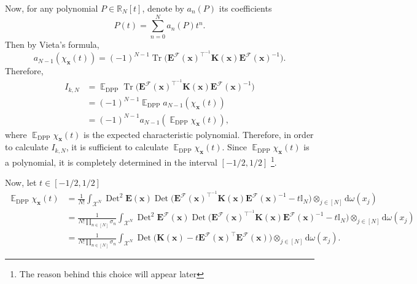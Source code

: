 \documentclass[twoside,11pt]{book}
\numberwithin{theorem}{chapter}
\numberwithin{definition}{chapter}
\numberwithin{proposition}{chapter}
\numberwithin{corollary}{chapter}
\numberwithin{example}{chapter}
\numberwithin{lemma}{chapter}
\numberwithin{assumption}{chapter}
\numberwithin{equation}{chapter}
\numberwithin{figure}{chapter}
\DeclareMathOperator{\Tr}{Tr}
\DeclareMathOperator{\Det}{Det}
\DeclareMathOperator{\DPP}{\mathrm{DPP}}
\DeclareMathOperator{\Tran}{\intercal}
\DeclareMathOperator{\EX}{\mathbb{E}}
\begin{document}
Now, for any polynomial $P \in \mathbb{R}_{N}[t]$, denote by $a_{n}(P)$ its coefficients
\begin{equation}
P(t) = \sum\limits_{n = 0}^{N} a_{n}(P)t^{n}.
\end{equation}
Then by Vieta's formula, 
\begin{equation}
a_{N-1}(\chi_{\bm{x}}(t)) = (-1)^{N-1}\Tr \Big(\bm{E}^{\mathcal{F}}(\bm{x})^{\Tran^{-1}}\bm{K}(\bm{x})\bm{E}^{\mathcal{F}}(\bm{x})^{-1} \Big).
\end{equation}
Therefore,
\begin{align}
I_{k,N}  & = \EX_{\DPP} \Tr \Big(\bm{E}^{\mathcal{F}}(\bm{x})^{\Tran^{-1}}\bm{K}(\bm{x})\bm{E}^{\mathcal{F}}(\bm{x})^{-1} \Big) \nonumber\\
& = (-1)^{N-1}\EX_{\DPP} a_{N-1}(\chi_{\bm{x}}(t)) \nonumber\\
& = (-1)^{N-1}a_{N-1}(\EX_{\DPP} \chi_{\bm{x}}(t)),
\end{align}
where $\EX_{\DPP} \chi_{\bm{x}}(t)$ is the expected characteristic polynomial. Therefore, in order to calculate $I_{k,N}$, it is sufficient to calculate $\EX_{\DPP} \chi_{\bm{x}}(t)$. Since $\EX_{\DPP} \chi_{\bm{x}}(t)$ is a polynomial, it is completely determined in the interval $[-1/2,1/2]$ \footnote{The reason behind this choice will appear later}.  

Now, let $t \in [-1/2,1/2]$
\begin{align}\label{eq:EX_chi_x}
 \EX_{\DPP} \chi_{\bm{x}}(t) & = \frac{1}{N!} \int_{\mathcal{X}^{N}} \Det^{2}\bm{E}(\bm{x}) \Det \Big( \bm{E}^{\mathcal{F}}(\bm{x})^{\Tran^{-1}}\bm{K}(\bm{x})\bm{E}^{\mathcal{F}}(\bm{x})^{-1}  - t \mathbb{I}_{N} \Big) \otimes_{j \in [N]} \mathrm{d}\omega(x_{j}) \nonumber\\
& = \frac{1}{N!\prod\limits_{n \in [N]}\sigma_{n}} \int_{\mathcal{X}^{N}} \Det^{2}\bm{E}^{\mathcal{F}}(\bm{x}) \Det \Big( \bm{E}^{\mathcal{F}}(\bm{x})^{\Tran^{-1}}\bm{K}(\bm{x})\bm{E}^{\mathcal{F}}(\bm{x})^{-1}  - t \mathbb{I}_{N} \Big) \otimes_{j \in [N]} \mathrm{d}\omega(x_{j}) \nonumber\\
& = \frac{1}{N!\prod\limits_{n \in [N]}\sigma_{n}} \int_{\mathcal{X}^{N}} \Det \Big( \bm{K}(\bm{x})  - t \bm{E}^{\mathcal{F}}(\bm{x})^{\Tran} \bm{E}^{\mathcal{F}}(\bm{x}) \Big) \otimes_{j \in [N]} \mathrm{d}\omega(x_{j}).
\end{align}
\end{document}
